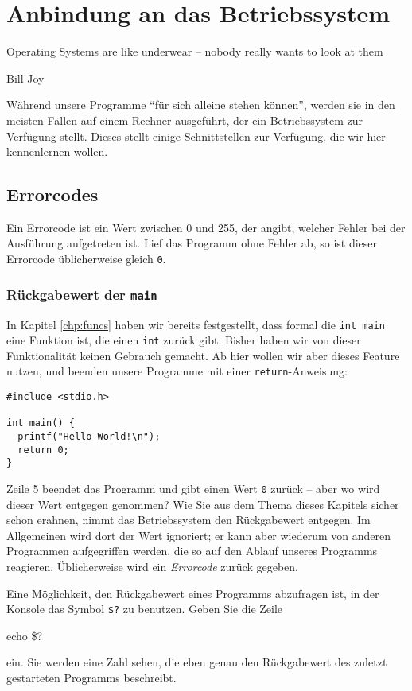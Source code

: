 \chapter{Anbindung an das Betriebssystem} \label{chp:OS-Link}
\epigraph{Operating Systems are like underwear -- nobody really wants to look at them}{Bill Joy}

Während unsere Programme \enquote{für sich alleine stehen können}, werden sie in den meisten Fällen auf einem Rechner ausgeführt, der ein Betriebssystem zur Verfügung stellt. Dieses stellt einige Schnittstellen zur Verfügung, die wir hier kennenlernen wollen.

\section{Errorcodes} \label{sec:errorcodes}
Ein Errorcode ist ein Wert zwischen 0 und 255, der angibt, welcher Fehler bei der Ausführung aufgetreten ist. Lief das Programm ohne Fehler ab, so ist dieser Errorcode üblicherweise gleich \texttt{0}.

\subsection{Rückgabewert der \texttt{main}}
In Kapitel \ref{chp:funcs} haben wir bereits festgestellt, dass formal die \texttt{int main} eine Funktion ist, die einen \texttt{int} zurück gibt. Bisher haben wir von dieser Funktionalität keinen Gebrauch gemacht. Ab hier wollen wir aber dieses Feature nutzen, und beenden unsere Programme mit einer \texttt{return}-Anweisung:
\begin{codebox}
\begin{verbatim}
#include <stdio.h>

int main() {
  printf("Hello World!\n");
  return 0;
}
\end{verbatim}
\end{codebox}

Zeile 5 beendet das Programm und gibt einen Wert \texttt{0} zurück -- aber wo wird dieser Wert entgegen genommen? Wie Sie aus dem Thema dieses Kapitels sicher schon erahnen, nimmt das Betriebssystem den Rückgabewert entgegen. Im Allgemeinen wird dort der Wert ignoriert; er kann aber wiederum von anderen Programmen aufgegriffen werden, die so auf den Ablauf unseres Programms reagieren. Üblicherweise wird ein \emph{Errorcode} zurück gegeben.

Eine Möglichkeit, den Rückgabewert eines Programms abzufragen ist, in der Konsole das Symbol \texttt{\$?} zu benutzen. Geben Sie die Zeile
\begin{cmdbox}
echo \$?
\end{cmdbox}
ein. Sie werden eine Zahl sehen, die eben genau den Rückgabewert des zuletzt gestarteten Programms beschreibt.

